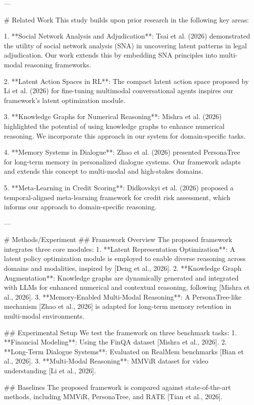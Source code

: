 ---

# Related Work  
This study builds upon prior research in the following key areas:

1. **Social Network Analysis and Adjudication**: Tsai et al. (2026) demonstrated the utility of social network analysis (SNA) in uncovering latent patterns in legal adjudication. Our work extends this by embedding SNA principles into multi-modal reasoning frameworks.

2. **Latent Action Spaces in RL**: The compact latent action space proposed by Li et al. (2026) for fine-tuning multimodal conversational agents inspires our framework's latent optimization module.

3. **Knowledge Graphs for Numerical Reasoning**: Mishra et al. (2026) highlighted the potential of using knowledge graphs to enhance numerical reasoning. We incorporate this approach in our system for domain-specific tasks.

4. **Memory Systems in Dialogue**: Zhao et al. (2026) presented PersonaTree for long-term memory in personalized dialogue systems. Our framework adapts and extends this concept to multi-modal and high-stakes domains.

5. **Meta-Learning in Credit Scoring**: Didkovskyi et al. (2026) proposed a temporal-aligned meta-learning framework for credit risk assessment, which informs our approach to domain-specific reasoning.

---

# Methods/Experiment  
## Framework Overview  
The proposed framework integrates three core modules:  
1. **Latent Representation Optimization**: A latent policy optimization module is employed to enable diverse reasoning across domains and modalities, inspired by [Deng et al., 2026].  
2. **Knowledge Graph Augmentation**: Knowledge graphs are dynamically generated and integrated with LLMs for enhanced numerical and contextual reasoning, following [Mishra et al., 2026].  
3. **Memory-Enabled Multi-Modal Reasoning**: A PersonaTree-like mechanism [Zhao et al., 2026] is adapted for long-term memory retention in multi-modal environments.

## Experimental Setup  
We test the framework on three benchmark tasks:  
1. **Financial Modeling**: Using the FinQA dataset [Mishra et al., 2026].  
2. **Long-Term Dialogue Systems**: Evaluated on RealMem benchmarks [Bian et al., 2026].  
3. **Multi-Modal Reasoning**: MMViR dataset for video understanding [Li et al., 2026].

## Baselines  
The proposed framework is compared against state-of-the-art methods, including MMViR, PersonaTree, and RATE [Tian et al., 2026].

